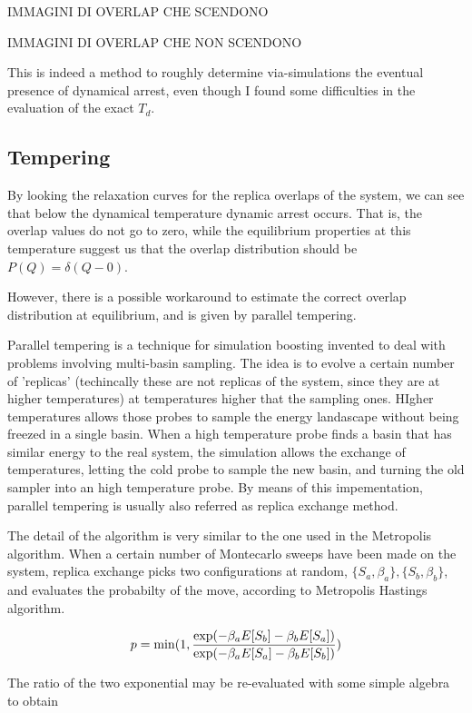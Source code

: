 \documentclass{article}
\begin{document}
IMMAGINI DI OVERLAP CHE SCENDONO 

IMMAGINI DI OVERLAP CHE NON SCENDONO

This is indeed a method to roughly determine via-simulations the eventual presence of dynamical arrest, even though I
found some difficulties in the evaluation of the exact $T_d$. 

\subsection{Tempering}

By looking the relaxation curves for the replica overlaps of the system, we can see that below the dynamical temperature dynamic arrest occurs. That is, the overlap values do not go to zero, while the equilibrium properties at this temperature suggest us that the overlap distribution should be $P(Q) = \delta(Q-0)$.


However, there is a possible workaround to estimate the correct overlap distribution at equilibrium, and is given by parallel tempering. 

Parallel tempering is a  technique for simulation boosting invented to deal with problems involving multi-basin sampling.
The idea is to evolve a certain number of 'replicas' (techincally these are not replicas of the system, since they are at higher temperatures) at temperatures higher that the sampling ones.
HIgher temperatures allows those probes to sample the energy landascape without being freezed in a single basin.
When a high temperature probe finds a basin that has similar energy to the real system, the simulation allows the exchange of temperatures, letting the cold probe to sample the new basin, and turning the old sampler into an high temperature probe. By means of this impementation, parallel tempering is usually also referred as replica exchange method.

The detail of the algorithm is very similar to the one used in the Metropolis algorithm. When a certain number of Montecarlo sweeps have been made on the system, replica exchange picks two configurations at random, $\{S_a,\beta_a\},\{S_b,\beta_b\}$, and evaluates the probabilty of the move, according to Metropolis Hastings algorithm. 

\begin{equation}
p = \min ( 1, { \exp( -\beta_a E[S_b] - \beta_b E[S_a]) \over \exp( -\beta_a E[S_a] - \beta_b E[S_b])   } )
\end{equation}

The ratio of the two exponential may be re-evaluated with some simple algebra to obtain
\end{document}
